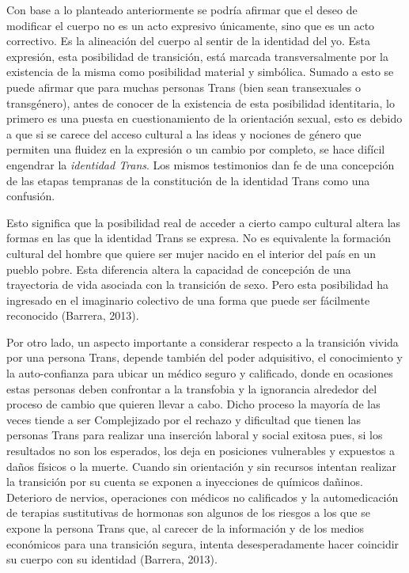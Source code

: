Con base a lo planteado anteriormente se podría afirmar que el deseo de
modificar el cuerpo no es un acto expresivo únicamente, sino que es un acto
correctivo.
Es la alineación del cuerpo al sentir de la identidad del yo.
Esta expresión, esta posibilidad de transición, está marcada transversalmente
por la existencia de la misma como posibilidad material y simbólica.
Sumado a esto se puede afirmar que para muchas personas Trans (bien sean
transexuales o transgénero), antes de conocer de la existencia de esta
posibilidad identitaria, lo primero es una puesta en cuestionamiento de la
orientación sexual, esto es debido a que si se carece del acceso cultural a las
ideas y nociones de género que permiten una fluidez en la expresión o un cambio
por completo, se hace difícil engendrar la \emph{identidad Trans}.
Los mismos testimonios dan fe de una concepción de las etapas tempranas de la
constitución de la identidad Trans como una confusión.

Esto significa que la posibilidad real de acceder a cierto campo cultural altera
las formas en las que la identidad Trans se expresa.
No es equivalente la formación cultural del hombre que quiere ser mujer nacido
en el interior del país en un pueblo pobre.
Esta diferencia altera la capacidad de concepción de una trayectoria de vida
asociada con la transición de sexo.
Pero esta posibilidad ha ingresado en el imaginario colectivo de una forma que
puede ser fácilmente reconocido (Barrera, 2013).

Por otro lado, un aspecto importante a considerar respecto a la transición
vivida por una persona Trans, depende también del poder adquisitivo, el
conocimiento y la auto-confianza para ubicar un médico seguro y calificado,
donde en ocasiones estas personas deben confrontar a la transfobia y la
ignorancia alrededor del proceso de cambio que quieren llevar a cabo.
Dicho proceso la mayoría de las veces tiende a ser Complejizado por el rechazo y
dificultad que tienen las personas Trans para realizar una inserción laboral y
social exitosa pues, si los resultados no son los esperados, los deja en
posiciones vulnerables y expuestos a daños físicos o la muerte.
Cuando sin orientación y sin recursos intentan realizar la transición por su
cuenta se exponen a inyecciones de químicos dañinos.
Deterioro de nervios, operaciones con médicos no calificados y la
automedicación de terapias sustitutivas de hormonas son algunos de los
riesgos a los que se expone la persona Trans que, al carecer de la
información y de los medios económicos para una transición segura,
intenta desesperadamente hacer coincidir su cuerpo con su identidad (Barrera,
2013).

